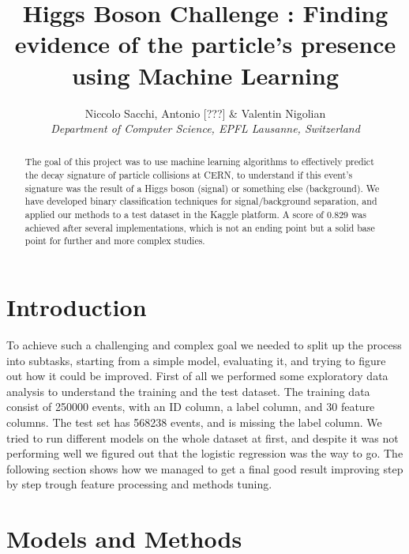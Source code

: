 \documentclass[10pt,conference,compsocconf]{IEEEtran}
\begin{document}
\title{Higgs Boson Challenge : Finding evidence of the particle's presence using Machine Learning}

\author{
  Niccolo Sacchi, Antonio [???] \& Valentin Nigolian\\
  \textit{Department of Computer Science, EPFL Lausanne, Switzerland}
}

\maketitle

\begin{abstract}
  The goal of this project was to use machine learning algorithms to effectively predict the decay  signature of particle collisions at CERN, to understand if this event's signature was the result of a Higgs boson (signal) or something else (background). We have developed binary classification techniques for signal/background separation, and applied our methods to a test dataset in the Kaggle platform.
  A score of 0.829 was achieved after several implementations, which is not an ending point but a solid base point for further and more complex studies.
\end{abstract}

\section{Introduction}

To achieve such a challenging and complex goal we needed to split up the process into subtasks, starting from a simple model, evaluating it, and trying to figure out how it could be improved.
First of all we performed some exploratory data analysis to understand the training and the test dataset. The training data consist of 250000 events, with an ID column, a label column, and 30 feature columns. The test set has 568238 events, and is missing the label column.
We tried to run different models on the whole dataset at first, and despite it was not performing well we figured out that the logistic regression was the way to go.
The following section shows how we managed to get a final good result improving step by step trough feature processing and methods tuning.



\section{Models and Methods}
\label{sec:mod_meth}
\end{document}
